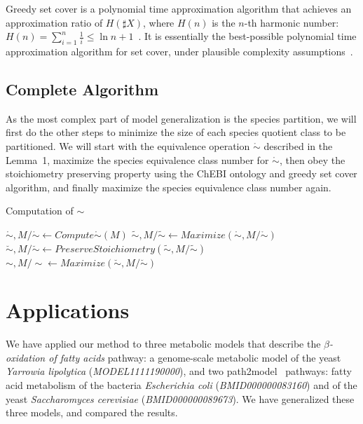 \documentclass[10pt]{bmc_article}
\newenvironment{bmcformat}{\baselineskip20pt\sloppy\setboolean{publ}{false}}{\baselineskip20pt\sloppy}
\begin{document}
\begin{bmcformat}
Greedy set cover is a polynomial time approximation algorithm that achieves an approximation ratio of $H(\sharp X)$, where $H(n)$ is the $n$-th harmonic number: $H(n) = \sum^n_{i = 1}\frac{1}{i} \leq \ln{n} + 1$~\cite{Chvatal1979}. It is essentially the best-possible polynomial time approximation algorithm for set cover, under plausible complexity assumptions~\cite{Lund1994}. 

\subsection*{Complete Algorithm}
As the most complex part of model generalization is the species partition, we will first do the other steps to minimize the size of each species quotient class to be partitioned. We will start with the equivalence operation $\mathring{\sim}$ described in the Lemma~1, maximize the species equivalence class number for $\mathring{\sim}$, then obey the stoichiometry preserving property using the ChEBI ontology and greedy set cover algorithm, and finally maximize the species equivalence class number again.\\

\begin{algorithm}[H]
\SetAlgoVlined
{}
\caption{Computation of ${\sim}$}
\BlankLine
\BlankLine
$\mathring{\sim}, M/\mathring{\sim} \leftarrow Compute\mathring{\sim}(M)$ \;
$\tilde{\sim}, M/\tilde{\sim} \leftarrow Maximize(\mathring{\sim}, M/{\mathring{\sim}})$ \;
$\breve{\sim}, M/\breve{\sim} \leftarrow PreserveStoichiometry(\tilde{\sim}, M/\tilde{\sim})$ \;
$\sim, M/\sim \leftarrow Maximize(\breve{\sim}, M/\breve{\sim})$ \;
\BlankLine
{}
\end{algorithm} 

\section*{Applications}
We have applied our method to three metabolic models that describe the \textit{$\beta$-oxidation of fatty acids} pathway: a genome-scale metabolic model of the yeast \textit{Yarrowia lipolytica} (\emph{MODEL1111190000}), and two path2model~\cite{Li10} pathways: fatty acid metabolism of the bacteria \textit{Escherichia coli} (\emph{BMID000000083160}) and of the yeast \textit{Saccharomyces cerevisiae} (\emph{BMID000000089673}). We have generalized these three models, and compared the results. 


\end{bmcformat}
\end{document}
